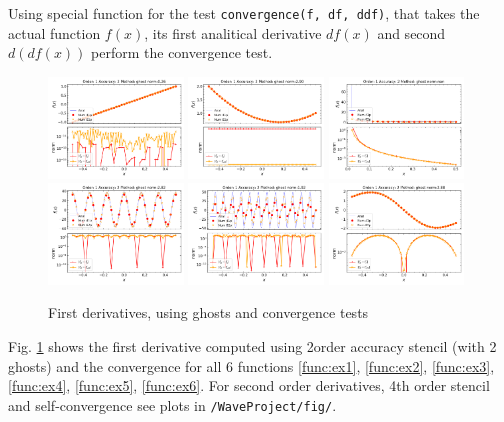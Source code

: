 \documentclass{article}
\begin{document}
Using special function for the test \texttt{convergence(f, df, ddf)}, that takes the actual function $f(x)$, its first analitical derivative $df(x)$ and second $d(df(x))$ perform the convergence test. \\
%
\begin{figure}[t]
	\centering 
	\includegraphics[width=0.32\textwidth]{./fig/f1_1_2_ghost.png}
	\includegraphics[width=0.32\textwidth]{./fig/f2_1_2_ghost.png}
	\includegraphics[width=0.32\textwidth]{./fig/f3_1_2_ghost.png}
	\includegraphics[width=0.32\textwidth]{./fig/f4_1_2_ghost.png}
	\includegraphics[width=0.32\textwidth]{./fig/f5_1_2_ghost.png}
	\includegraphics[width=0.32\textwidth]{./fig/f6_1_2_ghost.png}
	\caption{
		First derivatives, using ghosts and convergence tests
	}
	\label{fig:conv1}
\end{figure}
%
Fig. \ref{fig:conv1} shows the first derivative computed using 2order accuracy stencil (with 2 ghosts) and the convergence for all 6 functions  \ref{func:ex1}, \ref{func:ex2}, \ref{func:ex3}, \ref{func:ex4}, \ref{func:ex5}, \ref{func:ex6}. For second order derivatives, 4th order stencil and self-convergence see plots in \texttt{/WaveProject/fig/}.
\end{document}
